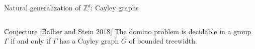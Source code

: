 \documentclass[11pt,dvipsnames,presentation,aspectratio=169]{beamer}
\begin{document}
\begin{frame}{Natural generalization of $\mathbb{Z}^d$: Cayley graphs}
\begin{columns}
\begin{column}{.35\textwidth}
\begin{center}
      \end{center}
    \end{column}
  \end{columns}

  \begin{alertblock}{Conjecture [Ballier and Stein 2018]}
    The domino problem is decidable in a group $\Gamma$ if and only if $\Gamma$
    has a Cayley graph $G$ of bounded treewidth.
  \end{alertblock}

\end{frame}
\end{document}
